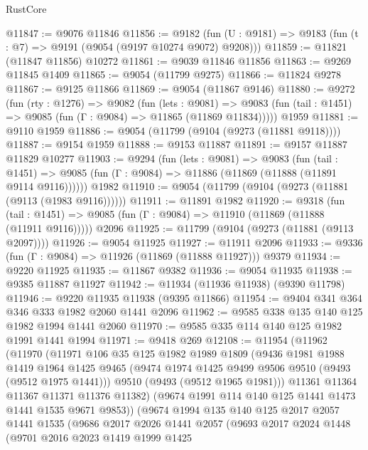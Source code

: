 \begin{lexlean}{RustCore}
\begin{coremodule}
@11847 := @9076 @11846
@11856 := @9182
    (fun (U : @9181) => @9183 (fun (t : @7) => @9191 (@9054 (@9197 @10274 @9072) @9208)))
@11859 := @11821 (@11847 @11856) @10272
@11861 := @9039 @11846 @11856
@11863 := @9269 @11845 @1409
@11865 := @9054 (@11799 @9275)
@11866 := @11824 @9278
@11867 := @9125 @11866
@11869 := @9054 (@11867 @9146)
@11880 := @9272
    (fun (rty : @1276) =>
    @9082
      (fun (lets : @9081) =>
      @9083 (fun (tail : @1451) => @9085 (fun (Γ : @9084) => @11865 (@11869 @11834)))))
    @1959
@11881 := @9110 @1959
@11886 := @9054 (@11799 (@9104 (@9273 (@11881 @9118))))
@11887 := @9154 @1959
@11888 := @9153 @11887
@11891 := @9157 @11887 @11829 @10277
@11903 := @9294
    (fun (lets : @9081) =>
    @9083
      (fun (tail : @1451) =>
      @9085 (fun (Γ : @9084) => @11886 (@11869 (@11888 (@11891 @9114 @9116))))))
    @1982
@11910 := @9054 (@11799 (@9104 (@9273 (@11881 (@9113 (@1983 @9116))))))
@11911 := @11891 @1982
@11920 := @9318
    (fun (tail : @1451) => @9085 (fun (Γ : @9084) => @11910 (@11869 (@11888 (@11911 @9116)))))
    @2096
@11925 := @11799 (@9104 (@9273 (@11881 (@9113 @2097))))
@11926 := @9054 @11925
@11927 := @11911 @2096
@11933 := @9336 (fun (Γ : @9084) => @11926 (@11869 (@11888 @11927))) @9379
@11934 := @9220 @11925
@11935 := @11867 @9382
@11936 := @9054 @11935
@11938 := @9385 @11887 @11927
@11942 := @11934 (@11936 @11938) (@9390 @11798)
@11946 := @9220 @11935 @11938 (@9395 @11866)
@11954 := @9404 @341 @364 @346 @333 @1982 @2060 @1441 @2096
@11962 := @9585 @338 @135 @140 @125 @1982 @1994 @1441 @2060
@11970 := @9585 @335 @114 @140 @125 @1982 @1991 @1441 @1994
@11971 := @9418 @269
@12108 := @11954
    (@11962
      (@11970
        (@11971
          @106
          @35
          @125
          @1982
          @1989
          @1809
          (@9436
            @1981
            @1988
            @1419
            @1964
            @1425
            @9465
            (@9474 @1974 @1425 @9499 @9506 @9510 (@9493 (@9512 @1975 @1441)))
            @9510
            (@9493 (@9512 @1965 @1981)))
          @11361
          @11364
          @11367
          @11371
          @11376
          @11382)
        (@9674 @1991 @114 @140 @125 @1441 @1473 @1441 @1535 @9671 @9853))
      (@9674
        @1994
        @135
        @140
        @125
        @2017
        @2057
        @1441
        @1535
        (@9686
          @2017
          @2026
          @1441
          @2057
          (@9693
            @2017
            @2024
            @1448
            (@9701
              @2016
              @2023
              @1419
              @1999
              @1425

\end{coremodule}
\end{lexlean}
